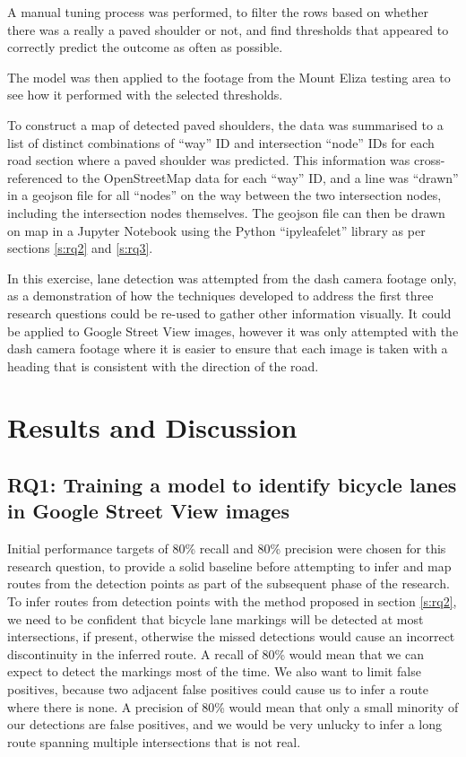 \documentclass[11pt,twoside]{report}
\begin{document}
A manual tuning process was performed, to filter the rows based on whether there was a really a paved shoulder or not, and find thresholds that appeared to correctly predict the outcome as often as possible.

The model was then applied to the footage from the Mount Eliza testing area to see how it performed with the selected thresholds.

To construct a map of detected paved shoulders, the data was summarised to a list of distinct combinations of ``way'' ID and intersection ``node'' IDs for each road section where a paved shoulder was predicted.  This information was cross-referenced to the OpenStreetMap data for each ``way'' ID, and a line was ``drawn'' in a geojson file for all ``nodes'' on the way between the two intersection nodes, including the intersection nodes themselves.  The geojson file can then be drawn on map in a Jupyter Notebook using the Python ``ipyleafelet'' library as per sections \ref{s:rq2} and \ref{s:rq3}.

In this exercise, lane detection was attempted from the dash camera footage only, as a demonstration of how the techniques developed to address the first three research questions could be re-used to gather other information visually.  It could be applied to Google Street View images, however it was only attempted with the dash camera footage where it is easier to ensure that each image is taken with a heading that is consistent with the direction of the road.  


\chapter{Results and Discussion}
\label{s:results}


\section{RQ1: Training a model to identify bicycle lanes in Google Street View images}
\label{results:rq1}

Initial performance targets of 80\% recall and 80\% precision were chosen for this research question, to provide a solid baseline before attempting to infer and map routes from the detection points as part of the subsequent phase of the research.  To infer routes from detection points with the method proposed in section \ref{s:rq2}, we need to be confident that bicycle lane markings will be detected at most intersections, if present, otherwise the missed detections would cause an incorrect discontinuity in the inferred route.  A recall of  80\% would mean that we can expect to detect the markings most of the time.  We also want to limit false positives, because two adjacent false positives could cause us to infer a route where there is none.  A precision of 80\% would mean that only a small minority of our detections are false positives, and we would be very unlucky to infer a long route spanning multiple intersections that is not real.
\end{document}
